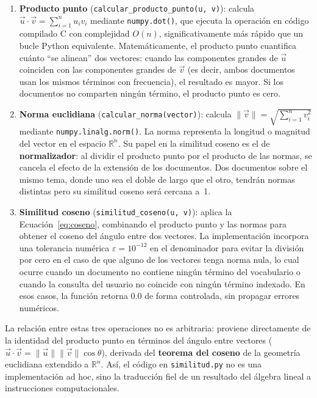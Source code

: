 \begin{enumerate}
    \item \textbf{Producto punto} (\texttt{calcular\_producto\_punto(u, v)}): calcula $\vec{u} \cdot \vec{v} = \sum_{i=1}^{n} u_i v_i$ mediante \texttt{numpy.dot()}, que ejecuta la operación en código compilado C con complejidad $O(n)$, significativamente más rápido que un bucle Python equivalente. Matemáticamente, el producto punto cuantifica cuánto ``se alinean'' dos vectores: cuando las componentes grandes de $\vec{u}$ coinciden con las componentes grandes de $\vec{v}$ (es decir, ambos documentos usan los mismos términos con frecuencia), el resultado es mayor. Si los documentos no comparten ningún término, el producto punto es cero.

    \item \textbf{Norma euclidiana} (\texttt{calcular\_norma(vector)}): calcula $\|\vec{v}\| = \sqrt{\sum_{i=1}^{n} v_i^2}$ mediante \texttt{numpy.linalg.norm()}. La norma representa la longitud o magnitud del vector en el espacio $\mathbb{R}^n$. Su papel en la similitud coseno es el de \textbf{normalizador}: al dividir el producto punto por el producto de las normas, se cancela el efecto de la extensión de los documentos. Dos documentos sobre el mismo tema, donde uno sea el doble de largo que el otro, tendrán normas distintas pero su similitud coseno será cercana a~1.

    \item \textbf{Similitud coseno} (\texttt{similitud\_coseno(u, v)}): aplica la Ecuación~\ref{eq:coseno}, combinando el producto punto y las normas para obtener el coseno del ángulo entre dos vectores. La implementación incorpora una tolerancia numérica $\varepsilon = 10^{-12}$ en el denominador para evitar la división por cero en el caso de que alguno de los vectores tenga norma nula, lo cual ocurre cuando un documento no contiene ningún término del vocabulario o cuando la consulta del usuario no coincide con ningún término indexado. En esos casos, la función retorna $0.0$ de forma controlada, sin propagar errores numéricos.
\end{enumerate}

La relación entre estas tres operaciones no es arbitraria: proviene directamente de la identidad del producto punto en términos del ángulo entre vectores ($\vec{u} \cdot \vec{v} = \|\vec{u}\|\|\vec{v}\|\cos\theta$), derivada del \textbf{teorema del coseno} de la geometría euclidiana extendido a $\mathbb{R}^n$. Así, el código en \texttt{similitud.py} no es una implementación ad hoc, sino la traducción fiel de un resultado del álgebra lineal a instrucciones computacionales.

